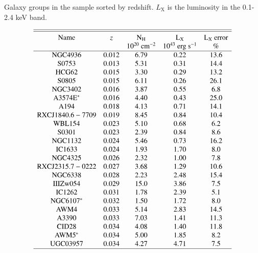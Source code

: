 \documentclass{aa} %
\begin{document}
\begin{table}[t]
  \caption{Galaxy groups in the sample sorted by redshift. $L_\text{X}$ is the luminosity in the 0.1-2.4 keV band.
 }
$$
\centering
\begin{array}{ccccc}
\hline\hline
\noalign{\smallskip}
{\rm Name} & z & {\rm N_H}  &  {\rm L_X} &   {\rm L_X \ error}  \\
     &   & {\rm 10^{20} \ cm^{-2} } & {\rm 10^{43} \ erg \ s^{-1} } & {\rm \% }          \\  
\hline
{\rm NGC4936} 	 	 & 0.012 & 6.79 & 0.22 & 13.6 \\ 
{\rm S0753}  		 & 0.013 & 5.31 & 0.31 & 14.4 \\ 
{\rm HCG62}  	  	 & 0.015 & 3.30 & 0.29 & 13.2 \\ 
{\rm S0805}  		 & 0.015 & 6.11 & 0.26 & 26.1 \\ 
{\rm NGC3402}		 & 0.016 & 3.87 & 0.55 & 6.8  \\ 
{\rm A3574E^{*}} 	 & 0.016 & 4.40 & 0.43 & 25.0 \\ 
{\rm A194 } 		 & 0.018 & 4.13 & 0.71 & 14.1 \\ 
{\rm RXCJ1840.6-7709}    & 0.019 & 8.45 & 0.84 & 10.4 \\ 
{\rm WBL154 	}	 & 0.023 & 5.10 & 0.68 & 6.2  \\ 
{\rm S0301  }		 & 0.023 & 2.39 & 0.84 & 8.6  \\ 
{\rm NGC1132 }	 	 & 0.024 & 5.46 & 0.73 & 16.2 \\ 
{\rm IC1633 }		 & 0.024 & 1.93 & 1.70 & 8.0  \\ 
{\rm NGC4325 }	 	 & 0.026 & 2.32 & 1.00 & 7.8  \\ 
{\rm RXCJ2315.7-0222 }   & 0.027 & 3.68 & 1.29 & 10.6 \\ 
{\rm NGC6338  }		 & 0.028 & 2.23 & 2.48 & 15.4 \\ 
{\rm IIIZw054	}	 & 0.029 & 15.0 & 3.86 & 7.5  \\ 
{\rm IC1262    }         & 0.031 & 1.78 & 2.39 & 5.1  \\ 
{\rm NGC6107^{*}  }	 & 0.032 & 1.50 & 1.72 & 8.0  \\ 
{\rm AWM4  	 }	 & 0.033 & 5.14 & 2.83 & 14.5 \\ 
{\rm A3390  	}	 & 0.033 & 7.03 & 1.41 & 11.3 \\ 
{\rm CID28 	}	 & 0.034 & 4.08 & 1.40 & 11.8 \\ 
{\rm AWM5^{*} }		 & 0.034 & 5.00 & 1.85 & 8.2  \\ 
{\rm UGC03957 	}	 & 0.034 & 4.27 & 4.71 & 7.5  \\ 
\hline
\end{array}
\label{tab:sample}
$$
\end{table}
\end{document}
